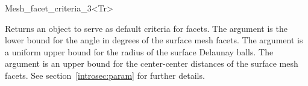 \begin{ccRefFunctionObjectClass}{Mesh_facet_criteria_3<Tr>}
\ccTypes


\ccCreation
{}  %

{Returns an object to serve as default criteria for facets. The argument 
 is the lower bound for the angle in degrees of the
surface mesh facets. The argument  is a uniform upper bound
for the radius of the surface Delaunay balls. The argument
 is an upper bound for the center-center distances
of the surface mesh facets. See
section~\ref{introsec:param} for further details.}



\ccSeeAlso

 \\
 \\
 \\




\end{ccRefFunctionObjectClass}

\ccRefPageEnd
